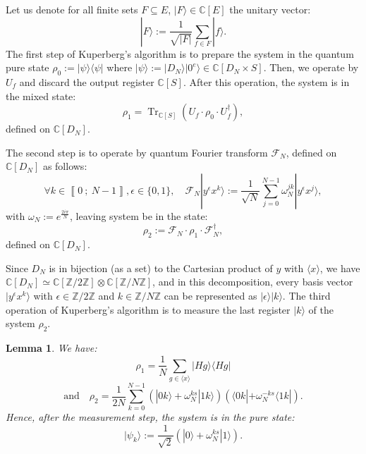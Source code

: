 \documentclass[a4paper,10pt,notitlepage]{report}
\theoremstyle{definition}
\theoremstyle{plain}
\newtheorem{Lemma}[Definition]{Lemma}
\theoremstyle{definition}
\newcommand{\Z}{\mathbb{Z}}
\newcommand{\C}{\mathbb{C}}
\newcommand{\m}[1]{\mathcal{#1}}
\renewcommand{\i}[2]{\left\llbracket #1~;~#2\right\rrbracket}
\renewcommand{\(}{\left(}
\renewcommand{\)}{\right)}
\DeclareMathOperator{\Tr}{Tr}
\begin{document}
Let us denote for all finite sets $F\subseteq E$, $|F\rangle\in\C[E]$ the unitary vector:
\[|F\rangle:=\frac{1}{\sqrt{|F|}}\sum_{f\in F}|f\rangle.\]
The first step of Kuperberg's algorithm is to prepare the system in the quantum pure state $\rho_0:=|\psi\rangle\langle\psi|$ where $|\psi\rangle:=|D_N\rangle|0^e\rangle\in\C[D_N\times S]$.  Then, we operate by $U_f$ and discard the output register $\C[S]$. After this operation, the system is in the mixed state:
\[\rho_1=\Tr_{\C[S]}(U_f\cdot \rho_0\cdot U_f^{\dag}),\]
defined on $\C[D_N]$.  

The second step is to operate by quantum Fourier transform $\m{F}_N$, defined on $\C[D_N]$ as follows:
\[\forall k\in\i{0}{N-1}, \epsilon\in\{0,1\}, \quad \m{F}_N|y^\epsilon x^k\rangle:=\frac{1}{\sqrt{N}}\sum_{j=0}^{N-1}\omega_N^{jk}|y^\epsilon x^j\rangle,\]
with $\omega_N:=e^{\frac{2i\pi}{N}}$, leaving system be in the state:
\[\rho_2:=\m{F}_N\cdot \rho_1\cdot \m{F}_N^{\dag},\]
defined on $\C[D_N]$.

Since $D_N$ is in bijection (as a set) to the Cartesian product of $y$ with $\langle x\rangle$, we have $\C[D_N]\simeq\C[\Z/2\Z]\otimes\C[\Z/N\Z]$, and in this decomposition, every basis vector $|y^\epsilon x^k\rangle$ with $\epsilon\in\Z/2\Z$ and $k\in\Z/N\Z$ can be represented as $|\epsilon\rangle|k\rangle$. The third operation of Kuperberg's algorithm is to measure the last register $|k\rangle$ of the system $\rho_2$.

\begin{Lemma}
We have:
\[\rho_1=\frac{1}{N}\sum_{g\in \langle x\rangle}|Hg\rangle\langle Hg|\]
\[\mbox{and} \quad \rho_2=\frac{1}{2N}\sum_{k=0}^{N-1}(|0k\rangle +\omega_N^{ks}|1k\rangle)(\langle 0k|+\omega_N^{-ks}\langle 1k|).\]
Hence, after the measurement step, the system is in the pure state:
\[|\psi_k\rangle:=\frac{1}{\sqrt{2}}(|0\rangle +\omega_N^{ks}|1\rangle).\]
\end{Lemma}
\end{document}
